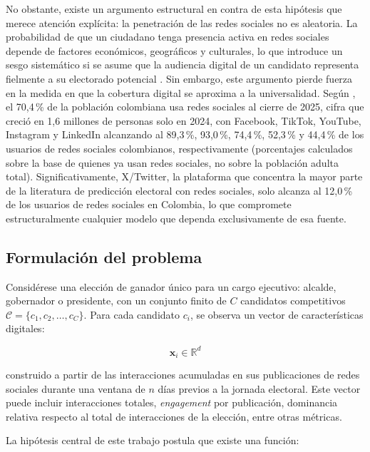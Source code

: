 No obstante, existe un argumento estructural en contra de esta
hipótesis que merece atención explícita: la penetración de las redes
sociales no es aleatoria. La probabilidad de que un ciudadano tenga
presencia activa en redes sociales depende de factores económicos,
geográficos y culturales, lo que introduce un sesgo sistemático si se
asume que la audiencia digital de un candidato representa fielmente
a su electorado potencial \parencite{skoric2020}. Sin embargo, este
argumento pierde fuerza en la medida en que la cobertura digital se
aproxima a la universalidad. Según \textcite{datareportal2026}, el
70{,}4\,\% de la población colombiana usa redes sociales al cierre de
2025, cifra que creció en 1{,}6 millones de personas solo en 2024,
con Facebook, TikTok, YouTube, Instagram y LinkedIn alcanzando al
89{,}3\,\%, 93{,}0\,\%, 74{,}4\,\%, 52{,}3\,\% y 44{,}4\,\% de los
usuarios de redes sociales colombianos, respectivamente (porcentajes
calculados sobre la base de quienes ya usan redes sociales, no sobre
la población adulta total). Significativamente, X/Twitter, la plataforma que concentra la mayor parte de la literatura de
predicción electoral con redes sociales, solo alcanza al 12{,}0\,\%
de los usuarios de redes sociales en Colombia, lo que compromete estructuralmente
cualquier modelo que dependa exclusivamente de esa fuente.

\subsection*{Formulación del problema}

Considérese una elección de ganador único para un cargo ejecutivo: alcalde, gobernador o presidente, con un conjunto finito de
$C$ candidatos competitivos $\mathcal{C} = \{c_1, c_2, \ldots, c_C\}$.
Para cada candidato $c_i$, se observa un vector de características
digitales:

\begin{equation}
    \mathbf{x}_i \in \mathbb{R}^d
    \label{eq:vector-caracteristicas}
\end{equation}

\noindent construido a partir de las interacciones acumuladas en sus
publicaciones de redes sociales durante una ventana de $n$ días previos
a la jornada electoral. Este vector puede incluir interacciones totales,
\textit{engagement} por publicación, dominancia relativa respecto al
total de interacciones de la elección, entre otras métricas.

La hipótesis central de este trabajo postula que existe una función:

